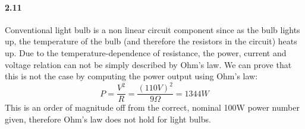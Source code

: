 \documentclass[authoryear, 12pt,5p, times]{elsarticle}
\begin{document}
\paragraph{\textbf{2.11}}
Conventional light bulb is a non linear circuit component since as the bulb lights up, the temperature of the bulb (and therefore the resistors in the circuit) heats up. Due to the temperature-dependence of resistance, the power, current and voltage relation can not be simply described by Ohm's law. We can prove that this is not the case by computing the power output using Ohm's law:
\begin{equation}
P = \frac{V^2}{R} = \frac{(110V)^2}{9\Omega}=1344W
\end{equation}
This is an order of magnitude off from the correct, nominal 100W power number given, therefore Ohm's law does not hold for light bulbs.
\end{document}
